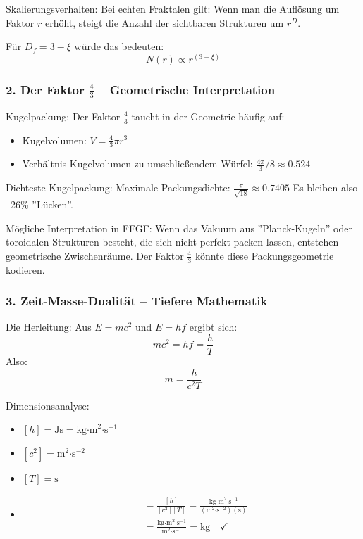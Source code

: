 	Skalierungsverhalten:
	Bei echten Fraktalen gilt: Wenn man die Auflösung um Faktor \( r \) erhöht, steigt die Anzahl der sichtbaren Strukturen um \( r^D \).
	
	Für \( D_f = 3 - \xi \) würde das bedeuten:
	\[
	N(r) \propto r^{(3-\xi)}
	\]
	
	\subsubsection{2. Der Faktor \( \frac{4}{3} \) – Geometrische Interpretation}
	Kugelpackung:
	Der Faktor \( \frac{4}{3} \) taucht in der Geometrie häufig auf:
	\begin{itemize}
		\item Kugelvolumen: \( V = \frac{4}{3}\pi r^3 \)
		\item Verhältnis Kugelvolumen zu umschließendem Würfel: \( \frac{4\pi}{3}/8 \approx 0.524 \)
	\end{itemize}
	
	Dichteste Kugelpackung:
	Maximale Packungsdichte: \( \frac{\pi}{\sqrt{18}} \approx 0.7405 \)
	Es bleiben also ~26\% ''Lücken''.
	
	Mögliche Interpretation in FFGF:
	Wenn das Vakuum aus ''Planck-Kugeln'' oder toroidalen Strukturen besteht, die sich nicht perfekt packen lassen, entstehen geometrische Zwischenräume. Der Faktor \( \frac{4}{3} \) könnte diese Packungsgeometrie kodieren.
	
	\subsubsection{3. Zeit-Masse-Dualität – Tiefere Mathematik}
	Die Herleitung:
	Aus \( E = mc^2 \) und \( E = hf \) ergibt sich:
	\[
	mc^2 = hf = \frac{h}{T}
	\]
	Also:
	\[
	m = \frac{h}{c^2 T}
	\]
	
	Dimensionsanalyse:
	\begin{itemize}
		\item \( [h] = \text{Js} = \text{kg·m}^2\text{·s}^{-1} \)
		\item \( [c^2] = \text{m}^2\text{·s}^{-2} \)
		\item \( [T] = \text{s} \)
		\item \begin{align}
			[m] &= \frac{[h]}{[c^2][T]} = \frac{\text{kg·m}^2\text{·s}^{-1}}{(\text{m}^2\text{·s}^{-2})(\text{s})} \\
			&= \frac{\text{kg·m}^2\text{·s}^{-1}}{\text{m}^2\text{·s}^{-1}} = \text{kg} \quad \checkmark
		\end{align}
	\end{itemize}
	
